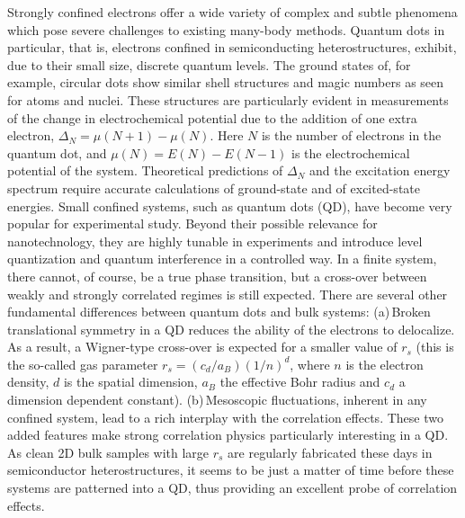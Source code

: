 \documentclass[twocolumn]{revtex4}
\begin{document}
Strongly confined electrons offer a wide variety of complex and subtle
phenomena which pose severe challenges to existing many-body methods.
Quantum dots in particular, that is, electrons confined in
semiconducting heterostructures, exhibit, due to their small size,
discrete quantum levels.  The ground states of, for example, circular
dots show similar shell structures and magic numbers as seen for atoms
and nuclei. These structures are particularly evident in measurements
of the change in electrochemical potential due to the addition of one
extra electron, $\Delta_N=\mu(N+1)-\mu(N)$. Here $N$ is the number of
electrons in the quantum dot, and $\mu(N)=E(N)-E(N-1)$ is the
electrochemical potential of the system.  Theoretical predictions of
$\Delta_N$ and the excitation energy spectrum require accurate
calculations of ground-state and of excited-state energies.  Small
confined systems, such as quantum dots (QD), have become very popular
for experimental study. Beyond their possible relevance for
nanotechnology, they are highly tunable in experiments and introduce
level quantization and quantum interference in a controlled way. In a
finite system, there cannot, of course, be a true phase transition,
but a cross-over between weakly and strongly correlated regimes is
still expected. There are several other fundamental differences
between quantum dots and bulk systems: (a)\,Broken translational
symmetry in a QD reduces the ability of the electrons to
delocalize. As a result, a Wigner-type cross-over is expected for a
smaller value of $r_s$ (this is the so-called gas parameter
$r_s=(c_d/a_B)(1/n)^d$, where $n$ is the electron density, $d$ is the
spatial dimension, $a_B$ the effective Bohr radius and $c_d$ a
dimension dependent constant). (b)\,Mesoscopic fluctuations, inherent
in any confined system, lead to a rich interplay with the correlation
effects. These two added features make strong correlation physics
particularly interesting in a QD. As clean 2D bulk samples with large
$r_s$ are regularly fabricated these days in semiconductor
heterostructures, it seems to be just a matter of time before these
systems are patterned into a QD, thus providing an excellent probe of
correlation effects.
\end{document}
